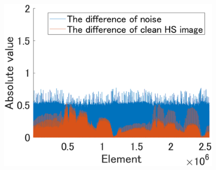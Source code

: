 \begin{figure}[t]
\begin{center}
\begin{minipage}{0.320\hsize}
		\end{minipage}
		\begin{minipage}{0.320\hsize}
			\centerline{\includegraphics[width=\hsize]{./fig_supplement/compare_sparsity/Beltsville_first_order_differences.eps}}
		\end{minipage}
		
		\vspace{1mm}
		

\end{center}
\end{figure}

